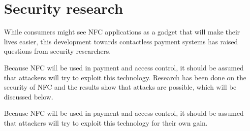 \section{Security research}

While consumers might see NFC applications as a gadget that will make their lives easier, this development towards contactless payment systems has raised questions from security researchers.

Because NFC will be used in payment and access control, it should be assumed that attackers will try to exploit this technology. Research has been done on the security of NFC and the results show that attacks are possible, which will be discussed below.

Because NFC will be used in payment and access control, it should be assumed that attackers will try to exploit this technology for their own gain. 


